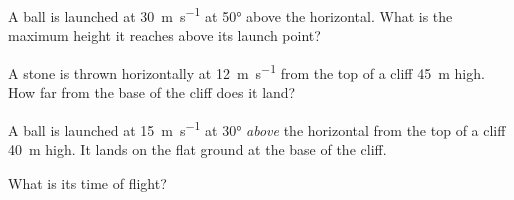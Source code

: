 \begin{quizq}{}
A ball is launched at \qty{30}{m.s^{-1}} at \ang{50} above the horizontal. What is the maximum height
it reaches above its launch point?
\end{quizq}

\begin{quizq}{}
A stone is thrown horizontally at \qty{12}{m.s^{-1}} from the top of a cliff \qty{45}{m} high. How far
from the base of the cliff does it land?
\end{quizq}

\begin{quizq}{}
A ball is launched at \qty{15}{m.s^{-1}} at \ang{30} \emph{above} the horizontal from the top of a cliff
\qty{40}{m} high. It lands on the flat ground at the base of the cliff.

What is its time of flight?
\end{quizq}
